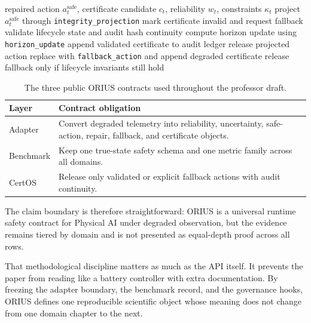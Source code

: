 \begin{algorithm}[t]
\caption{CertOS Certificate Release and Lifecycle Update}
\label{alg:prof-certos}
\begin{algorithmic}
\Require repaired action \(a_t^{\mathrm{safe}}\), certificate candidate \(c_t\), reliability \(w_t\), constraints \(\kappa_t\)
\State project \(a_t^{\mathrm{safe}}\) through \texttt{integrity\_projection}
  \State mark certificate invalid and request fallback
\EndIf
\State validate lifecycle state and audit hash continuity
  \State compute horizon update using \texttt{horizon\_update}
  \State append validated certificate to audit ledger
  \State release projected action
\Else
  \State replace with \texttt{fallback\_action} and append degraded certificate
  \State release fallback only if lifecycle invariants still hold
\EndIf
\end{algorithmic}
\end{algorithm}

\begin{table}[t]
\centering
\small
\caption{The three public ORIUS contracts used throughout the professor draft.}
\label{tab:prof-contract-stack}
\begin{tabularx}{\columnwidth}{@{}p{}X@{}}
\toprule
\textbf{Layer} & \textbf{Contract obligation} \\
\midrule
Adapter & Convert degraded telemetry into reliability, uncertainty, safe-action, repair, fallback, and certificate objects. \\
Benchmark & Keep one true-state safety schema and one metric family across all domains. \\
CertOS & Release only validated or explicit fallback actions with audit continuity. \\
\bottomrule
\end{tabularx}
\end{table}

The claim boundary is therefore straightforward: ORIUS is a universal
runtime safety contract for Physical AI under degraded observation, but the
evidence remains tiered by domain and is not presented as equal-depth proof
across all rows.

That methodological discipline matters as much as the API itself. It prevents the paper
from reading like a battery controller with extra documentation. By freezing the
adapter boundary, the benchmark record, and the governance hooks, ORIUS defines one
reproducible scientific object whose meaning does not change from one domain chapter to
the next.
